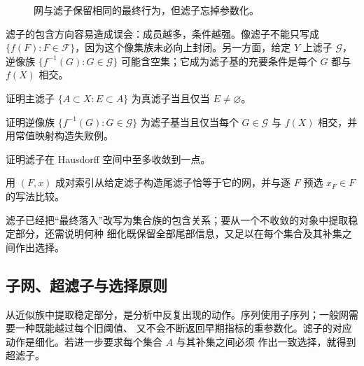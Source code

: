 \begin{figure}[htbp]
\centering
{}
\caption{网与滤子保留相同的最终行为，但滤子忘掉参数化。}\label{fig:1-1-2-net-filter-translation}
\end{figure}

滤子的包含方向容易造成误会：成员越多，条件越强。像滤子不能只写成
\(\{f(F):F\in\mathcal F\}\)，因为这个像集族未必向上封闭。另一方面，给定 \(Y\) 上滤子
\(\mathcal G\)，逆像族 \(\{f^{-1}(G):G\in\mathcal G\}\) 可能含空集；它成为滤子基的充要条件是每个
\(G\) 都与 \(f(X)\) 相交。

\begin{exercise}
证明主滤子 \(\{A\subset X:E\subset A\}\) 为真滤子当且仅当 \(E\ne\varnothing\)。
\end{exercise}
\begin{exercise}
证明逆像族 \(\{f^{-1}(G):G\in\mathcal G\}\) 为滤子基当且仅当每个 \(G\in\mathcal G\) 与
\(f(X)\) 相交，并用常值映射构造失败例。
\end{exercise}
\begin{exercise}
证明滤子在 Hausdorff 空间中至多收敛到一点。
\end{exercise}
\begin{exercise}
用 \((F,x)\) 成对索引从给定滤子构造尾滤子恰等于它的网，并与逐 \(F\) 预选 \(x_F\in F\) 的写法比较。
\end{exercise}

滤子已经把“最终落入”改写为集合族的包含关系；要从一个不收敛的对象中提取稳定部分，还需说明何种
细化既保留全部尾部信息，又足以在每个集合及其补集之间作出选择。

\subsection{子网、超滤子与选择原则}\label{subsec:1-1-3}

从近似族中提取稳定部分，是分析中反复出现的动作。序列使用子序列；一般网需要一种既能越过每个旧阈值、
又不会不断返回早期指标的重参数化。滤子的对应动作是细化。若进一步要求每个集合 \(A\) 与其补集之间必须
作出一致选择，就得到超滤子。

